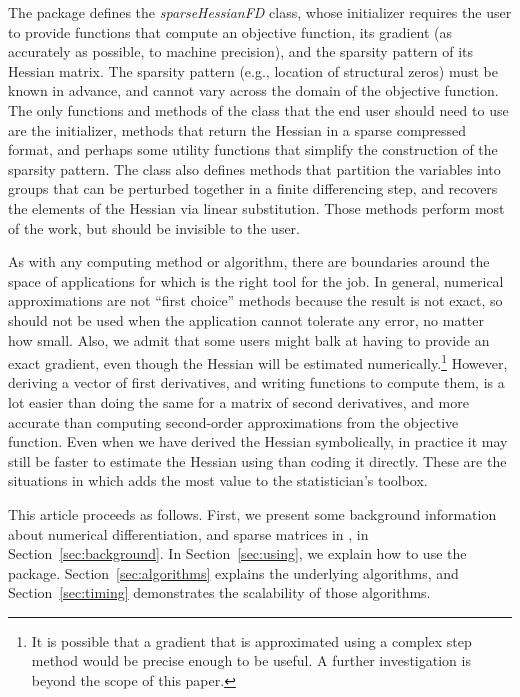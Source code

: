 \documentclass[jss]{jss}\usepackage[]{graphicx}\usepackage[]{color}
\newcommand{\class}[1]{\textsl{#1}}
\begin{document}
The package defines the \class{sparseHessianFD} class, whose initializer
requires the user to provide functions that compute an objective
function, its gradient (as accurately as possible, to machine precision), and the sparsity pattern of its Hessian
matrix. The sparsity pattern (e.g., location of structural
zeros) must be known in advance, and cannot vary across the domain of the
objective function. The only functions and methods of the class that
the end user should need to use are the
initializer, methods that return the Hessian
in a sparse compressed format, and perhaps some utility functions that
simplify the construction of the sparsity pattern.  The class also
defines methods that partition the variables into groups that can be perturbed together in a finite
differencing step, and recovers the elements of the Hessian via linear
substitution.  Those methods perform most of the work, but should be
invisible to the user.

As with any computing method or algorithm, there are boundaries around
the space of applications for which  is the right
tool for the job. In general, numerical approximations are not ``first
choice'' methods because the result is not exact, so
 should not be used when the application cannot
tolerate any error, no matter how small.  Also, we admit that some
users might balk at having to provide an exact gradient, even though
the Hessian will be estimated numerically.\footnote{It is possible
  that a gradient that is approximated using a complex step method
  would be precise enough to be useful. A further investigation is
  beyond the scope of this paper.} However, deriving a vector of first
derivatives, and writing  functions to compute them, is a
lot easier than doing the same for a matrix of second derivatives, and
more accurate than computing second-order approximations from the
objective function. Even when we have derived the Hessian
symbolically, in practice it may still be faster to estimate the Hessian
using  than coding it directly.  These are the
situations in which  adds the most value to the
statistician's toolbox.

This article proceeds as follows.  First, we present
some background information about numerical differentiation, and
sparse matrices in , in Section~\ref{sec:background}.  In
Section~\ref{sec:using}, we explain how to use the package.
Section~\ref{sec:algorithms} explains the underlying algorithms, and
Section~\ref{sec:timing} demonstrates the scalability of those algorithms.
\end{document}
